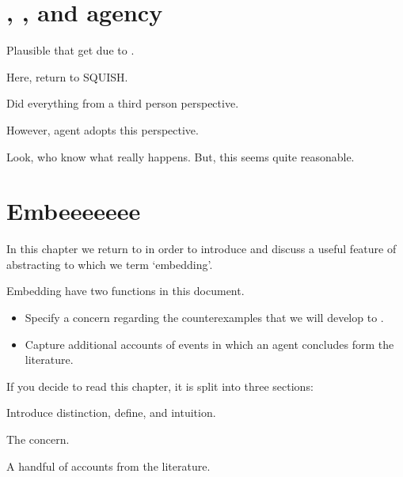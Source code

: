 \section{, , and agency}
\label{sec:ninf2-requ1-agency}

\begin{note}
  Plausible that get \ninf{} due to \requ{}.

  Here, return to SQUISH.

  Did everything from a third person perspective.

  However, agent adopts this perspective.

  Look, who know what really happens.
  But, this seems quite reasonable.
\end{note}

\section{Embeeeeeee}
\label{sec:embeeeeeee}

\begin{note}
  In this chapter we return to  in order to introduce and discuss a useful feature of abstracting to  which we term `embedding'.

  Embedding have two functions in this document.
  \begin{itemize}
  \item
    Specify a concern regarding the counterexamples that we will develop to \issueConstraint{}.
  \item
    Capture additional accounts of events in which an agent concludes form the literature.
  \end{itemize}
\end{note}

\begin{note}
  If you decide to read this chapter, it is split into three sections:

  \begin{TOCEnum}
  \item

    Introduce distinction, define, and intuition.
  \item

    The concern.
  \item

    A handful of accounts from the literature.
  \end{TOCEnum}
\end{note}

